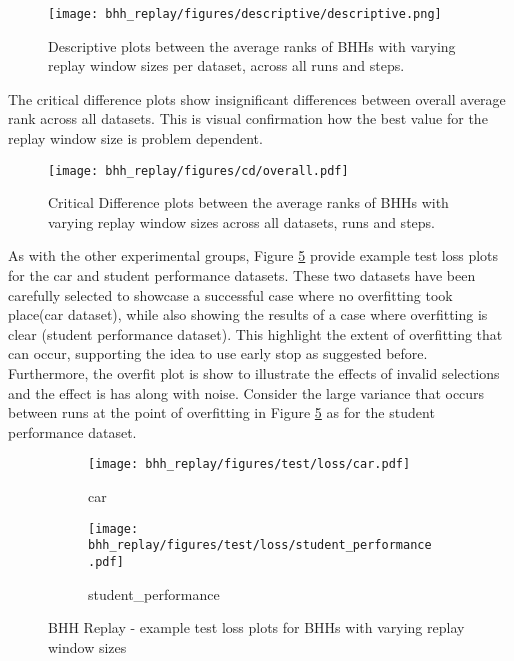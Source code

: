 \begin{figure}[htbp]
      \centering
      \texttt{[image: bhh\_replay/figures/descriptive/descriptive.png]}
      \caption{Descriptive plots between the average ranks of \Acsp{BHH} with varying replay window sizes per dataset, across all runs and steps.}
      \label{fig:results:replay:descriptive:descriptive}
\end{figure}

The critical difference plots show insignificant differences between overall average rank across all datasets. This is visual confirmation how the best value for the replay window size is problem dependent.

\begin{figure}[htbp]
      \centering
      \texttt{[image: bhh\_replay/figures/cd/overall.pdf]}
      \caption{Critical Difference plots between the average ranks of \Acsp{BHH} with varying replay window sizes across all datasets, runs and steps.}
      \label{fig:results:replay:descriptive:cd}
\end{figure}


As with the other experimental groups, Figure \ref{fig:results:replay:figures:loss} provide example test loss plots for the car and student performance datasets. These two datasets have been carefully selected to showcase a successful case where no overfitting took place(car dataset), while also showing the results of a case where overfitting is clear (student performance dataset). This highlight the extent of overfitting that can occur, supporting the idea to use early stop as suggested before. Furthermore, the overfit plot is show to illustrate the effects of invalid selections and the effect is has along with noise. Consider the large variance that occurs between runs at the point of overfitting in Figure \ref{fig:results:replay:figures:loss} as for the student performance dataset.


\begin{figure}[htbp]
      \begin{subfigure}{0.5\textwidth}
            \centering
            \texttt{[image: bhh\_replay/figures/test/loss/car.pdf]}
            \caption{car}
            \label{fig:results:replay:figures:loss1}
      \end{subfigure}
      \begin{subfigure}{0.5\textwidth}
            \centering
            \texttt{[image: bhh\_replay/figures/test/loss/student\_performance.pdf]}
            \caption{student\_performance}
            \label{fig:results:replay:figures:loss2}
      \end{subfigure}
      \caption{\Acs{BHH} Replay - example test loss plots for \Acsp{BHH} with varying replay window sizes}
      \label{fig:results:replay:figures:loss}
\end{figure}

